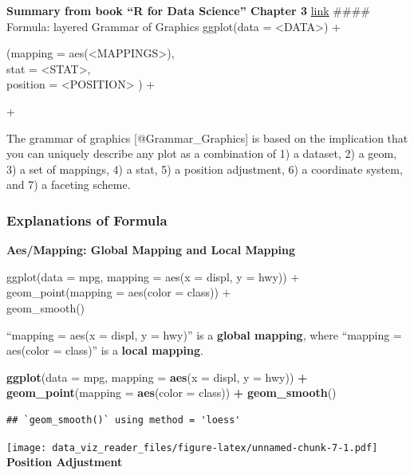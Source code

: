 \documentclass[]{book}
\newenvironment{Shaded}{\begin{snugshade}}{\end{snugshade}}
\newcommand{\KeywordTok}[1]{\textcolor[rgb]{0.13,0.29,0.53}{\textbf{#1}}}
\newcommand{\DataTypeTok}[1]{\textcolor[rgb]{0.13,0.29,0.53}{#1}}
\newcommand{\StringTok}[1]{\textcolor[rgb]{0.31,0.60,0.02}{#1}}
\newcommand{\OperatorTok}[1]{\textcolor[rgb]{0.81,0.36,0.00}{\textbf{#1}}}
\newcommand{\NormalTok}[1]{#1}
\theoremstyle{definition}
\theoremstyle{definition}
\theoremstyle{definition}
\theoremstyle{remark}
\begin{document}
\textbf{Summary from book ``R for Data Science'' Chapter 3}
\href{http://r4ds.had.co.nz/data-visualisation.html}{link} \#\#\#\#
Formula: layered Grammar of Graphics ggplot(data =
\textless{}DATA\textgreater{}) +

 (mapping = aes(\textless{}MAPPINGS\textgreater{}),\\
stat = \textless{}STAT\textgreater{},\\
position = \textless{}POSITION\textgreater{} ) +

 +

The grammar of graphics {[}@Grammar\_Graphics{]} is based on the
implication that you can uniquely describe any plot as a combination of
1) a dataset, 2) a geom, 3) a set of mappings, 4) a stat, 5) a position
adjustment, 6) a coordinate system, and 7) a faceting scheme.

\subsubsection{Explanations of Formula}\label{explanations-of-formula}

\textbf{Aes/Mapping: Global Mapping and Local Mapping}

ggplot(data = mpg, mapping = aes(x = displ, y = hwy)) +\\
geom\_point(mapping = aes(color = class)) +\\
geom\_smooth()

``mapping = aes(x = displ, y = hwy)'' is a \textbf{global mapping},
where ``mapping = aes(color = class)'' is a \textbf{local mapping}.

\begin{Shaded}
\begin{Highlighting}[]
\KeywordTok{ggplot}\NormalTok{(}\DataTypeTok{data =}\NormalTok{ mpg, }\DataTypeTok{mapping =} \KeywordTok{aes}\NormalTok{(}\DataTypeTok{x =}\NormalTok{ displ, }\DataTypeTok{y =}\NormalTok{ hwy)) }\OperatorTok{+}\StringTok{  }\KeywordTok{geom_point}\NormalTok{(}\DataTypeTok{mapping =} \KeywordTok{aes}\NormalTok{(}\DataTypeTok{color =}\NormalTok{ class)) }\OperatorTok{+}\StringTok{  }\KeywordTok{geom_smooth}\NormalTok{()}
\end{Highlighting}
\end{Shaded}

\begin{verbatim}
## `geom_smooth()` using method = 'loess'
\end{verbatim}

\texttt{[image: data\_viz\_reader\_files/figure-latex/unnamed-chunk-7-1.pdf]}
\textbf{Position Adjustment}
\end{document}
